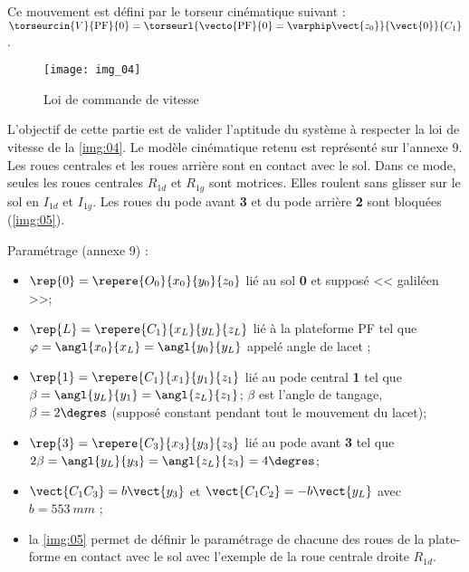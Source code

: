 Ce mouvement est défini par le torseur cinématique suivant : 
$\torseurcin{V}{\text{PF}}{0} = \torseurl{\vecto{\text{PF}}{0}=\varphip \vect{z_0}}{\vect{0}}{C_1}$.

\begin{wrapfigure}{r}{5.5cm}
\centering
\texttt{[image: img\_04]}
\caption{Loi de commande de vitesse \label{img:04}}
\end{wrapfigure}L’objectif de cette partie est de valider l’aptitude du système à respecter la
loi de vitesse de la \autoref{img:04}.
Le modèle cinématique retenu est représenté sur l’annexe 9.
Les roues centrales et les roues arrière sont en contact avec le sol. Dans ce
mode, seules les roues centrales $R_{1d}$ et $R_{1g}$ sont motrices. Elles roulent
sans glisser sur le sol en $I_{1d}$ et $I_{1g}$. Les roues du pode avant \textbf{3} et du pode
arrière \textbf{2} sont bloquées (\autoref{img:05}).



Paramétrage (annexe 9) : 
\begin{itemize}
\item $\rep{0}=\repere{O_0}{x_0}{y_0}{z_0}$ lié au sol \textbf{0} et supposé << galiléen >>;
\item $\rep{L}=\repere{C_1}{x_L}{y_L}{z_L}$ lié à la plateforme PF tel que $\varphi=\angl{x_0}{x_L}=\angl{y_0}{y_L}$ appelé angle de lacet ;
\item $\rep{1}=\repere{C_1}{x_1}{y_1}{z_1}$ lié au pode central \textbf{1} tel que $\beta=\angl{y_L}{y_1}=\angl{z_L}{z_1}$; $\beta$ est l'angle de tangage, $\beta=2\degres$ (supposé constant pendant tout le mouvement du lacet);
\item $\rep{3}=\repere{C_3}{x_3}{y_3}{z_3}$ lié au pode avant \textbf{3} tel que $2\beta=\angl{y_L}{y_3}=\angl{z_L}{z_3}=4\degres$;
\item $\vect{C_1C_3}=b\vect{y_3}$ et $\vect{C_1C_2}=-b\vect{y_L}$ avec $b = \SI{553}{mm}$ ;
\item la \autoref{img:05} permet de définir le paramétrage de chacune des roues de la plate-forme en contact avec le sol avec
l’exemple de la roue centrale droite $R_{1d}$.
\end{itemize}

